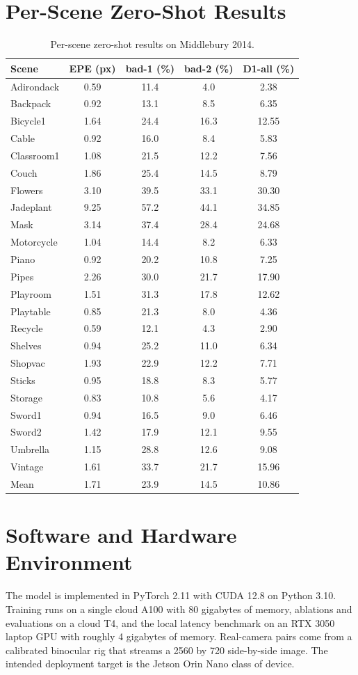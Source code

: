 \section{Per-Scene Zero-Shot Results}
\begin{table}[H]
\centering
\caption{Per-scene zero-shot results on Middlebury 2014.}
\label{tab:mb14_perscene_full}
\small
\begin{tabular}{lcccc}
\toprule
Scene & EPE (px) & bad-1 (\%) & bad-2 (\%) & D1-all (\%)\\
\midrule
Adirondack & 0.59 & 11.4 & 4.0 & 2.38\\
Backpack & 0.92 & 13.1 & 8.5 & 6.35\\
Bicycle1 & 1.64 & 24.4 & 16.3 & 12.55\\
Cable & 0.92 & 16.0 & 8.4 & 5.83\\
Classroom1 & 1.08 & 21.5 & 12.2 & 7.56\\
Couch & 1.86 & 25.4 & 14.5 & 8.79\\
Flowers & 3.10 & 39.5 & 33.1 & 30.30\\
Jadeplant & 9.25 & 57.2 & 44.1 & 34.85\\
Mask & 3.14 & 37.4 & 28.4 & 24.68\\
Motorcycle & 1.04 & 14.4 & 8.2 & 6.33\\
Piano & 0.92 & 20.2 & 10.8 & 7.25\\
Pipes & 2.26 & 30.0 & 21.7 & 17.90\\
Playroom & 1.51 & 31.3 & 17.8 & 12.62\\
Playtable & 0.85 & 21.3 & 8.0 & 4.36\\
Recycle & 0.59 & 12.1 & 4.3 & 2.90\\
Shelves & 0.94 & 25.2 & 11.0 & 6.34\\
Shopvac & 1.93 & 22.9 & 12.2 & 7.71\\
Sticks & 0.95 & 18.8 & 8.3 & 5.77\\
Storage & 0.83 & 10.8 & 5.6 & 4.17\\
Sword1 & 0.94 & 16.5 & 9.0 & 6.46\\
Sword2 & 1.42 & 17.9 & 12.1 & 9.55\\
Umbrella & 1.15 & 28.8 & 12.6 & 9.08\\
Vintage & 1.61 & 33.7 & 21.7 & 15.96\\
\midrule
Mean & 1.71 & 23.9 & 14.5 & 10.86\\
\bottomrule
\end{tabular}
\end{table}

\section{Software and Hardware Environment}
The model is implemented in PyTorch 2.11 with CUDA 12.8 on Python 3.10.
Training runs on a single cloud A100 with 80 gigabytes of memory,
ablations and evaluations on a cloud T4, and the local latency benchmark
on an RTX 3050 laptop GPU with roughly 4 gigabytes of memory. Real-camera
pairs come from a calibrated binocular rig that streams a 2560 by 720
side-by-side image. The intended deployment target is the Jetson Orin Nano
class of device.


